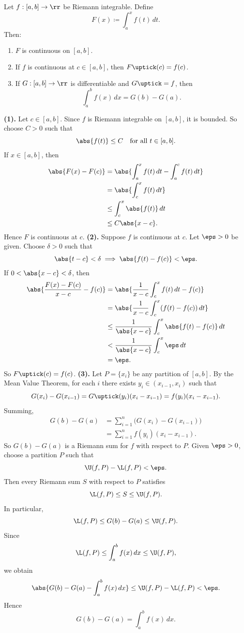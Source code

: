\begin{theorem}{
    Let $f:[a,b]\to\rr$ be Riemann integrable.
    Define
    \[
        F(x) \coloneqq \int_a^x f(t)\,dt.
    \]
    Then:
    \begin{enumerate}
        \item $F$ is continuous on $[a,b]$.
        \item If $f$ is continuous at $c\in[a,b]$, then $F\uptick(c) = f(c)$.
        \item If $G:[a,b]\to\rr$ is differentiable and $G\uptick = f$, then
        \[
            \int_a^b f(x)\,dx = G(b) - G(a).
        \]
    \end{enumerate}
}
    \textbf{(1).}
    Let $c\in[a,b]$.
    Since $f$ is Riemann integrable on $[a,b]$, it is bounded.
    So choose $C>0$ such that
    \[
        \abs{f(t)}\leq C \quad \text{for all } t\in[a,b].
    \]
    If $x\in[a,b]$, then
    \begin{align*}
        \abs{F(x)-F(c)}
        &= \abs{\int_a^x f(t)\,dt-\int_a^c f(t)\,dt}\\
        &= \abs{\int_c^x f(t)\,dt}\\
        &\leq \int_c^x \abs{f(t)}\,dt\\
        &\leq C\abs{x-c}.
    \end{align*}
    Hence $F$ is continuous at $c$.
    \textbf{(2).}
    Suppose $f$ is continuous at $c$.
    Let $\eps>0$ be given.
    Choose $\delta>0$ such that
    \[
        \abs{t-c}<\delta \implies \abs{f(t)-f(c)}<\eps.
    \]
    If $0<\abs{x-c}<\delta$, then
    \begin{align*}
        \abs{\frac{F(x)-F(c)}{x-c}-f(c)}
        &= \abs{\frac{1}{x-c}\int_c^x f(t)\,dt - f(c)}\\
        &= \abs{\frac{1}{x-c}\int_c^x (f(t)-f(c))\,dt}\\
        &\leq \frac{1}{\abs{x-c}} \int_c^x \abs{f(t)-f(c)}\,dt\\
        &< \frac{1}{\abs{x-c}} \int_c^x \eps\,dt\\
        &= \eps.
    \end{align*}
    So $F\uptick(c)=f(c)$.
    \textbf{(3).}
    Let $P=\{x_i\}$ be any partition of $[a,b]$.
    By the Mean Value Theorem, for each $i$ there exists $y_i\in(x_{i-1},x_i)$ such that
    \[
        G(x_i)-G(x_{i-1}) = G\uptick(y_i)(x_i-x_{i-1}) = f(y_i)(x_i-x_{i-1}).
    \]
    Summing,
    \begin{align*}
        G(b)-G(a)
        &= \sum_{i=1}^n \bigl(G(x_i)-G(x_{i-1})\bigr)\\
        &= \sum_{i=1}^n f(y_i)(x_i-x_{i-1}).
    \end{align*}
    So $G(b)-G(a)$ is a Riemann sum for $f$ with respect to $P$.
    Given $\eps>0$, choose a partition $P$ such that
    \[
        \U(f,P)-\L(f,P)<\eps.
    \]
    Then every Riemann sum $S$ with respect to $P$ satisfies
    \[
        \L(f,P)\leq S\leq \U(f,P).
    \]
    In particular,
    \[
        \L(f,P)\leq G(b)-G(a)\leq \U(f,P).
    \]
    Since
    \[
        \L(f,P)\leq \int_a^b f(x)\,dx \leq \U(f,P),
    \]
    we obtain
    \[
        \abs{G(b)-G(a)-\int_a^b f(x)\,dx}\leq \U(f,P)-\L(f,P)<\eps.
    \]
    Hence
    \[
        G(b)-G(a)=\int_a^b f(x)\,dx.
    \]
\end{theorem}